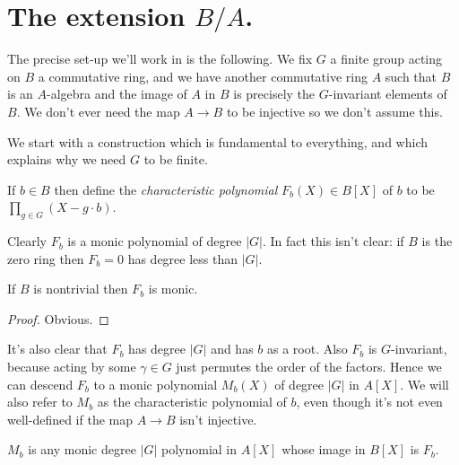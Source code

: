 \section{The extension $B/A$.}

The precise set-up we'll work in is the following. We fix $G$ a finite group acting
on $B$ a commutative ring, and we have another commutative ring $A$ such
that $B$ is an $A$-algebra and the image of $A$ in $B$ is precisely the $G$-invariant
elements of $B$. We don't ever need the map $A\to B$ to be injective so we don't assume this.

We start with a construction which is fundamental to everything,
and which explains why we need $G$ to be finite.

\begin{definition}
  \label{MulSemiringAction.CharacteristicPolynomial.F}
  \leanok
  If $b\in B$ then define the \emph{characteristic polynomial}
  $F_b(X) \in B[X]$ of $b$ to be $\prod_{g\in G}(X-g\cdot b)$.
\end{definition}

Clearly $F_b$ is a monic polynomial of degree $|G|$. In fact this isn't clear:
if $B$ is the zero ring then $F_b=0$ has degree less than $|G|$.

\begin{lemma}
  \label{MulSemiringAction.CharacteristicPolynomial.F_degree}
  \leanok
  If $B$ is nontrivial then $F_b$ is monic.
\end{lemma}
\begin{proof} Obvious.
\end{proof}

It's also clear that $F_b$ has degree $|G|$ and has $b$ as a root.
Also $F_b$ is $G$-invariant, because acting by some $\gamma\in G$
just permutes the order of the factors. Hence we can descend $F_b$
to a monic polynomial $M_b(X)$ of degree $|G|$ in $A[X]$. We will
also refer to $M_b$ as the characteristic polynomial of $b$, even though
it's not even well-defined if the map $A\to B$ isn't injective.

\begin{definition}
  \label{MulSemiringAction.CharacteristicPolynomial.M}
  \leanok
  $M_b$ is any monic degree $|G|$ polynomial in $A[X]$ whose
  image in $B[X]$ is $F_b$.
\end{definition}

